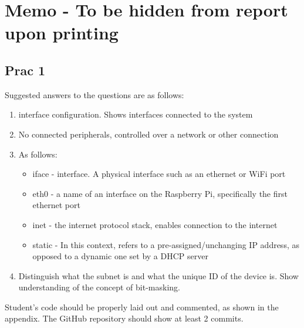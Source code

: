 \section{Memo - To be hidden from report upon printing}
\subsection{Prac 1}
Suggested answers to the questions are as follows:
\begin{enumerate}
    \item interface configuration. Shows interfaces connected to the system
    \item No connected peripherals, controlled over a network or other connection
    \item As follows:
        \begin{itemize}
            \item iface - interface. A physical interface such as an ethernet or WiFi port
            \item eth0 - a name of an interface on the Raspberry Pi, specifically the first ethernet port
            \item inet - the internet protocol stack, enables connection to the internet
            \item static - In this context, refers to a pre-assigned/unchanging IP address, as opposed to a dynamic one set by a DHCP server
        \end{itemize}
    \item Distinguish what the subnet is and what the unique ID of the device is. Show understanding of the concept of bit-masking.
\end{enumerate}
Student's code should be properly laid out and commented, as shown in the appendix. The GitHub repository should show at least 2 commits.